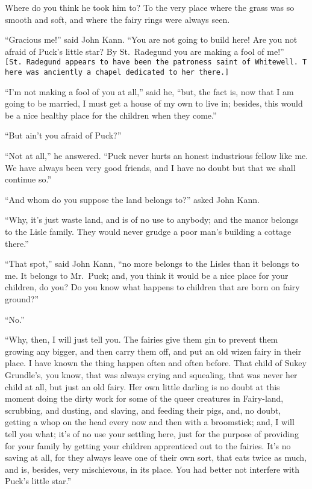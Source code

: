 \documentclass[
  12pt,
  a5paper,
  twoside]{book}
\let\oldtexttt\texttt        %
\renewcommand{\texttt}[1]{\footnotesize\oldtexttt{#1}}
\begin{document}
Where do you think he took him to? To the very place where the grass was
so smooth and soft, and where the fairy rings were always seen.

``Gracious me!'' said John Kann. ``You are not going to build here! Are
you not afraid of Puck's little star? By St.~Radegund you are making a
fool of me!''
\texttt{{[}St.\ Radegund\ appears\ to\ have\ been\ the\ patroness\ saint\ of\ Whitewell.\ There\ was\ anciently\ a\ chapel\ dedicated\ to\ her\ there.{]}}

``I'm not making a fool of you at all,'' said he, ``but, the fact is,
now that I am going to be married, I must get a house of my own to live
in; besides, this would be a nice healthy place for the children when
they come.''

``But ain't you afraid of Puck?''

``Not at all,'' he answered. ``Puck never hurts an honest industrious
fellow like me. We have always been very good friends, and I have no
doubt but that we shall continue so.''

``And whom do you suppose the land belongs to?'' asked John Kann.

``Why, it's just waste land, and is of no use to anybody; and the manor
belongs to the Lisle family. They would never grudge a poor man's
building a cottage there.''

``That spot,'' said John Kann, ``no more belongs to the Lisles than it
belongs to me. It belongs to Mr.~Puck; and, you think it would be a nice
place for your children, do you? Do you know what happens to children
that are born on fairy ground?''

``No.''

``Why, then, I will just tell you. The fairies give them gin to prevent
them growing any bigger, and then carry them off, and put an old wizen
fairy in their place. I have known the thing happen often and often
before. That child of Sukey Grundle's, you know, that was always crying
and squealing, that was never her child at all, but just an old fairy.
Her own little darling is no doubt at this moment doing the dirty work
for some of the queer creatures in Fairy-land, scrubbing, and dusting,
and slaving, and feeding their pigs, and, no doubt, getting a whop on
the head every now and then with a broomstick; and, I will tell you
what; it's of no use your settling here, just for the purpose of
providing for your family by getting your children apprenticed out to
the fairies. It's no saving at all, for they always leave one of their
own sort, that eats twice as much, and is, besides, very mischievous, in
its place. You had better not interfere with Puck's little star.''
\end{document}
